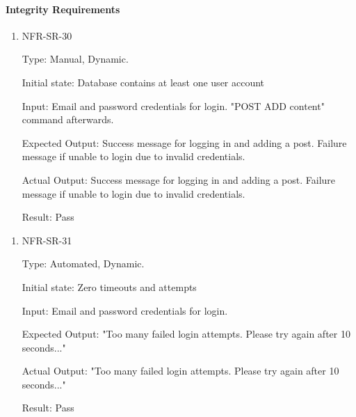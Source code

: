 \documentclass[12pt, titlepage]{article}
\begin{document}
 \paragraph{Integrity Requirements}
\begin{enumerate}
    \item{NFR-SR-30\\}
    
    Type: Manual, Dynamic.
    
    Initial state: Database contains at least one user account
    
    Input: Email and password credentials for login. "POST ADD content" command afterwards.
    
    Expected Output: Success message for logging in and adding a post. Failure message if unable to login due to invalid credentials.
    
    Actual Output: Success message for logging in and adding a post. Failure message if unable to login due to invalid credentials.
    					
    Result: Pass
 \end{enumerate} 
 
 \begin{enumerate}
    \item{NFR-SR-31\\}
    
    Type: Automated, Dynamic.
    
    Initial state: Zero timeouts and attempts
    
    Input: Email and password credentials for login.
    
    Expected Output: "Too many failed login attempts. Please try again after 10 seconds..."
    
    Actual Output: "Too many failed login attempts. Please try again after 10 seconds..."
    					
    Result: Pass
 \end{enumerate} 

\newpage
\end{document}
